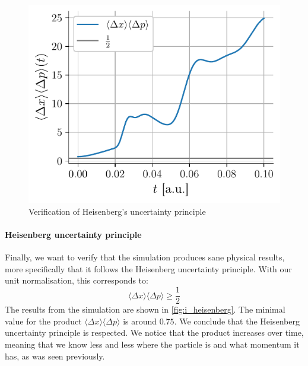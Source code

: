 \begin{figure}
    \centering
    \includegraphics[width=\linewidth]{figures/i_heisenberg.pdf}
    \caption{Verification of Heisenberg's uncertainty principle}
    \label{fig:i_heisenberg}
\end{figure}
\paragraph{Heisenberg uncertainty principle} Finally, we want to verify that the simulation produces sane physical results, more specifically that it follows the Heisenberg uncertainty principle. With our unit normalisation, this corresponds to:
\begin{equation}
    \langle \Delta x \rangle \langle \Delta p \rangle \ge \frac{1}{2}
\end{equation}
The results from the simulation are shown in \autoref{fig:i_heisenberg}. The minimal value for the product \(\langle \Delta x \rangle \langle \Delta p \rangle\) is around \(0.75\). We conclude that the Heisenberg uncertainty principle is respected. We notice that the product increases over time, meaning that we know less and less where the particle is and what momentum it has, as was seen previously.

